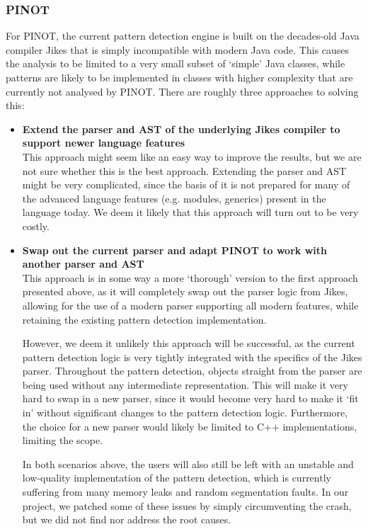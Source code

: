 \subsubsection{PINOT}
For PINOT, the current pattern detection engine is built on the decades-old Java compiler Jikes that is simply incompatible with modern Java code. This causes the analysis to be limited to a very small subset of `simple' Java classes, while patterns are likely to be implemented in classes with higher complexity that are currently not analysed by PINOT. There are roughly three approaches to solving this:
\begin{itemize}
    \item {\bf Extend the parser and AST of the underlying Jikes compiler to support newer language features}\\
    This approach might seem like an easy way to improve the results, but we are not sure whether this is the best approach. Extending the parser and AST might be very complicated, since the basis of it is not prepared for many of the advanced language features (e.g. modules, generics) present in the language today. We deem it likely that this approach will turn out to be very costly.
    
    \item {\bf Swap out the current parser and adapt PINOT to work with another parser and AST}\\
    This approach is in some way a more `thorough' version to the first approach presented above, as it will completely swap out the parser logic from Jikes, allowing for the use of a modern parser supporting all modern features, while retaining the existing pattern detection implementation.
    
    However, we deem it unlikely this approach will be successful, as the current pattern detection logic is very tightly integrated with the specifics of the Jikes parser. Throughout the pattern detection, objects straight from the parser are being used without any intermediate representation. This will make it very hard to swap in a new parser, since it would become very hard to make it `fit in' without significant changes to the pattern detection logic. Furthermore, the choice for a new parser would likely be limited to C++ implementations, limiting the scope.
    
    In both scenarios above, the users will also still be left with an unstable and low-quality implementation of the pattern detection, which is currently suffering from many memory leaks and random segmentation faults. In our project, we patched some of these issues by simply circumventing the crash, but we did not find nor address the root causes.
    

\end{itemize}
